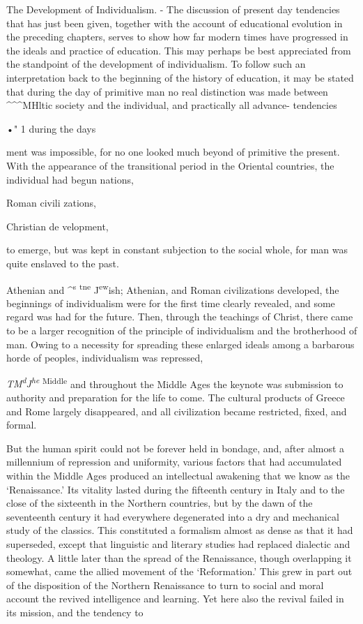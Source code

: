 \documentclass[]{book}
\begin{document}
The Development of Individualism. - The discussion of present day tendencies that has just been given, together with the account of educational evolution in the preceding chapters, serves to show how far modern times have progressed in the ideals and practice of education. This may perhaps be best appreciated from the standpoint of the development of individualism. To follow such an interpretation back to the beginning of the history of education, it may be stated that during the day of primitive man no real distinction was made between \^{}\^{}\^{}MHltic society and the individual, and practically all advance- tendencies

•" 1 during the days

ment was impossible, for no one looked much beyond of primitive the present. With the appearance of the transitional period in the Oriental countries, the individual had begun nations,

Roman civili zations,

Christian de velopment,

to emerge, but was kept in constant subjection to the social whole, for man was quite enslaved to the past.

Athenian and \^{}\textsuperscript{s} \textsuperscript{tne} J\textsuperscript{ew}ish; Athenian, and Roman civilizations developed, the beginnings of individualism were for the first time clearly revealed, and some regard was had for the future. Then, through the teachings of Christ, there came to be a larger recognition of the principle of individualism and the brotherhood of man. Owing to a necessity for spreading these enlarged ideals among a barbarous horde of peoples, individualism was repressed,

\emph{TM\textsuperscript{d}J\textsuperscript{he}} \textsuperscript{Middle} and throughout the Middle Ages the keynote was submission to authority and preparation for the life to come. The cultural products of Greece and Rome largely disappeared, and all civilization became restricted, fixed, and formal.

But the human spirit could not be forever held in bondage, and, after almost a millennium of repression and uniformity, various factors that had accumulated within the Middle Ages produced an intellectual awakening that we know as the `Renaissance.' Its vitality lasted during the fifteenth century in Italy and to the close of the sixteenth in the Northern countries, but by the dawn of the seventeenth century it had everywhere degenerated into a dry and mechanical study of the classics. This constituted a formalism almost as dense as that it had superseded, except that linguistic and literary studies had replaced dialectic and theology. A little later than the spread of the Renaissance, though overlapping it somewhat, came the allied movement of the `Reformation.' This grew in part out of the disposition of the Northern Renaissance to turn to social and moral account the revived intelligence and learning. Yet here also the revival failed in its mission, and the tendency to
\end{document}

